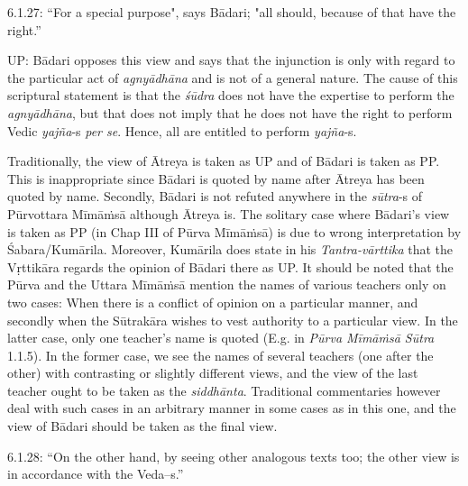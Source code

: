 \vspace{.1cm}

6.1.27: “For a special purpose", says Bādari; "all should, because of that have the right.”

\vspace{.1cm}

UP: Bādari opposes this view and says that the injunction is only with regard to the particular act of \textit{agnyādhāna} and is not of a general nature. The cause of this scriptural statement is that the \textit{śūdra} does not have the expertise to perform the \textit{agnyādhāna}, but that does not imply that he does not have the right to perform Vedic \textit{yajña}-s \textit{per se}. Hence, all are entitled to perform \textit{yajña}-s.

\vspace{.1cm}

Traditionally, the view of Ātreya is taken as UP and of Bādari is taken as PP. This is inappropriate since Bādari is quoted by name after Ātreya has been quoted by name. Secondly, Bādari is not refuted anywhere in the \textit{sūtra}-s of Pūrvottara Mīmāṁsā although Ātreya is. The solitary case where Bādari’s view is taken as PP (in Chap III of Pūrva Mīmāṁsā) is due to wrong interpretation by Śabara/Kumārila. Moreover, Kumārila does state in his \textit{Tantra-vārttika} that the Vṛttikāra regards the opinion of Bādari there as UP. It should be noted that the Pūrva and the Uttara Mīmāṁsā mention the names of various teachers only on two cases: When there is a conflict of opinion on a particular manner, and secondly when the Sūtrakāra wishes to vest authority to a particular view. In the latter case, only one teacher’s name is quoted (E.g. in \textit{Pūrva Mīmāṁsā Sūtra} 1.1.5). In the former case, we see the names of several teachers (one after the other) with contrasting or slightly different views, and the view of the last teacher ought to be taken as the \textit{siddhānta}. Traditional commentaries however deal with such cases in an arbitrary manner in some cases as in this one, and the view of Bādari should be taken as the final view.

\vspace{.1cm}

6.1.28: “On the other hand, by seeing other analogous texts too; the other view is in accordance with the Veda--s.”

\vspace{.1cm}

